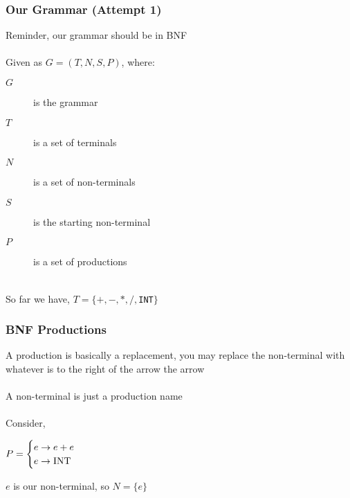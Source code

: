 \documentclass[aspectratio=169]{beamer}
\begin{document}
\begin{frame}
\frametitle{Our Grammar (Attempt 1)}

Reminder, our grammar should be in \alert{BNF}\\~\\

Given as $G = (T, N, S, P)$, where:

\begin{description}
  \item[$G$] is the grammar
  \item[$T$] is a set of terminals
  \item[$N$] is a set of non-terminals
  \item[$S$] is the starting non-terminal
  \item[$P$] is a set of productions\\~\\
\end{description}

So far we have, $T = \{ +, -, *, /,$\lstinline{INT}$\}$
\end{frame}

\begin{frame}
\frametitle{BNF Productions}

A production is basically a replacement, you may replace the
\alert{non-terminal} with whatever is to the right of the arrow the arrow\\~\\

A \alert{non-terminal} is just a production name\\~\\

Consider,

\begin{center}
$P = \begin{cases}e \rightarrow e + e \\
     e \rightarrow \text{\lstinline{INT}}\end{cases}$
\end{center}

$e$ is our \alert{non-terminal}, so $N = \{ e \}$
\end{frame}
\end{document}
